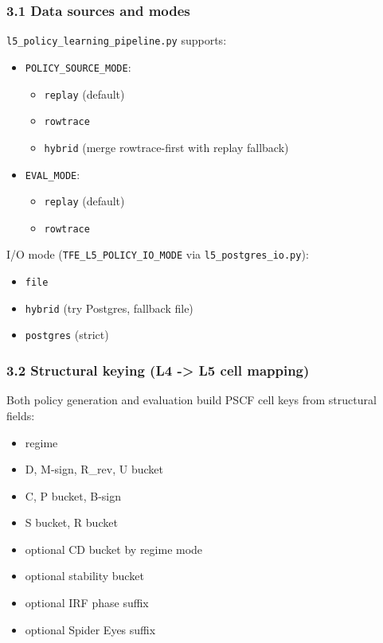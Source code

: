 \documentclass[
]{article}
\providecommand{\tightlist}{%
  \setlength{\itemsep}{0pt}\setlength{\parskip}{0pt}}
\begin{document}
\subsubsection{3.1 Data sources and
modes}\label{31-data-sources-and-modes}

\texttt{l5\_policy\_learning\_pipeline.py} supports:

\begin{itemize}
\tightlist
\item
  \texttt{POLICY\_SOURCE\_MODE}:

  \begin{itemize}
  \tightlist
  \item
    \texttt{replay} (default)
  \item
    \texttt{rowtrace}
  \item
    \texttt{hybrid} (merge rowtrace-first with replay fallback)
  \end{itemize}
\item
  \texttt{EVAL\_MODE}:

  \begin{itemize}
  \tightlist
  \item
    \texttt{replay} (default)
  \item
    \texttt{rowtrace}
  \end{itemize}
\end{itemize}

I/O mode (\texttt{TFE\_L5\_POLICY\_IO\_MODE} via
\texttt{l5\_postgres\_io.py}):

\begin{itemize}
\tightlist
\item
  \texttt{file}
\item
  \texttt{hybrid} (try Postgres, fallback file)
\item
  \texttt{postgres} (strict)
\end{itemize}

\subsubsection{3.2 Structural keying (L4 -\textgreater{} L5 cell
mapping)}\label{32-structural-keying-l4---l5-cell-mapping}

Both policy generation and evaluation build PSCF cell keys from
structural fields:

\begin{itemize}
\tightlist
\item
  regime
\item
  D, M-sign, R\_rev, U bucket
\item
  C, P bucket, B-sign
\item
  S bucket, R bucket
\item
  optional CD bucket by regime mode
\item
  optional stability bucket
\item
  optional IRF phase suffix
\item
  optional Spider Eyes suffix
\end{itemize}
\end{document}
